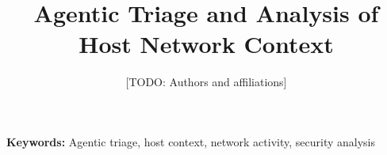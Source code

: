 \documentclass[11pt]{article}
\title{Agentic Triage and Analysis of Host Network Context}
\author{[TODO: Authors and affiliations]}
\date{}
\begin{document}
\maketitle

\begin{abstract}

\end{abstract}

\noindent\textbf{Keywords:} Agentic triage, host context, network activity, security analysis





\end{document}
